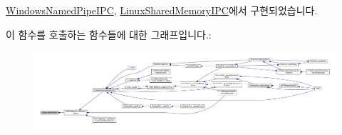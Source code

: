 \hyperlink{class_windows_named_pipe_i_p_c_ab4218ec21d3322c365b300cfdb23b263}{Windows\+Named\+Pipe\+I\+PC}, \hyperlink{class_linux_shared_memory_i_p_c_ab4218ec21d3322c365b300cfdb23b263}{Linux\+Shared\+Memory\+I\+PC}에서 구현되었습니다.



이 함수를 호출하는 함수들에 대한 그래프입니다.\+:
\nopagebreak
\begin{figure}[H]
\begin{center}
\leavevmode
\includegraphics[width=350pt]{class_o_s___i_p_c_a322c3dc7306144448f366a525f634fdf_icgraph}
\end{center}
\end{figure}



